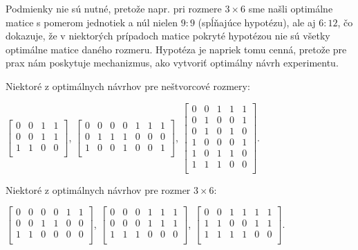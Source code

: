 \begin{com}
Podmienky nie sú nutné, pretože napr. pri rozmere $3 \times 6$ sme našli optimálne matice s pomerom jednotiek a núl
nielen $9:9$ (spĺňajúce hypotézu), ale aj $6:12$, čo dokazuje, 
že v niektorých prípadoch matice pokryté hypotézou nie sú všetky optimálne matice daného rozmeru. 
Hypotéza je napriek tomu cenná, pretože pre prax nám poskytuje mechanizmus, ako vytvoriť optimálny návrh experimentu.
\end{com}

Niektoré z optimálnych návrhov pre neštvorcové rozmery:

\begin{center}
$
\begin{bmatrix}
0 & 0 & 1 & 1 \\
0 & 0 & 1 & 1 \\
1 & 1 & 0 & 0 \\
\end{bmatrix}
$,
$
\begin{bmatrix}
0 & 0 & 0 & 0 & 1 & 1 & 1 \\
0 & 1 & 1 & 1 & 0 & 0 & 0 \\
1 & 0 & 0 & 1 & 0 & 0 & 1 \\
\end{bmatrix}
$,
$
\begin{bmatrix}
0 & 0 & 1 & 1 & 1 \\ 
0 & 1 & 0 & 0 & 1 \\ 
0 & 1 & 0 & 1 & 0 \\ 
1 & 0 & 0 & 0 & 1 \\ 
1 & 0 & 1 & 1 & 0 \\ 
1 & 1 & 1 & 0 & 0 \\ 
\end{bmatrix}
$.
\end{center}

Niektoré z optimálnych návrhov pre rozmer $3 \times 6$:

\begin{center}
$
\begin{bmatrix}
0 & 0 & 0 & 0 & 1 & 1 \\
0 & 0 & 1 & 1 & 0 & 0 \\
1 & 1 & 0 & 0 & 0 & 0 \\
\end{bmatrix}
$,
$
\begin{bmatrix}
0 & 0 & 0 & 1 & 1 & 1 \\
0 & 0 & 0 & 1 & 1 & 1 \\
1 & 1 & 1 & 0 & 0 & 0 \\
\end{bmatrix}
$,
$
\begin{bmatrix}
0 & 0 & 1 & 1 & 1 & 1 \\
1 & 1 & 0 & 0 & 1 & 1 \\
1 & 1 & 1 & 1 & 0 & 0 \\
\end{bmatrix}
$.
\end{center}

